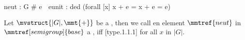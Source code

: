 \begin{module}[id=semigroup,meta=http://kwarc.info/test?FOL]
\end{module}

\begin{module}[id=monoid,meta=http://kwarc.info/test?FOL]
\begin{MMT}[axioms]
  neut : G # e ^^1e
  eunit : ded (forall [x] x + e = x + e = e)^^1e
 \end{MMT}
 \begin{definition}
 Let $\mvstruct{|G|,\mmt{+} }$ be a , 
  then we call en element $\mmtref{neut}$ in $\mmtref[semigroup]{base}$ a
  , iff [type.1.1.1] for all $x$ in $|G|$. 
 \end{definition}  
\end{module}
